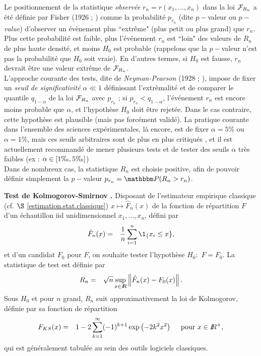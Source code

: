  Le positionnement de la statistique {\it observ\'ee} $r_n=r(x_1,\ldots,x_n)$ dans la loi ${\cal{F}}_{R_n}$ a \'et\'e d\'efinie par Fisher (1926 ; \cite{Fisher1926}) comme la probabilit\'e $p_{r_n}$ (dite $p-$valeur ou {\it $p-$value}) d'observer un \'ev\`enement plus ``extr\^eme" (plus petit ou plus grand) que $r_n$.
Plus cette probabilit\'e est faible, plus l'\'ev\'enement  $r_n$ est ``loin" des valeurs de $R_n$ de plus haute densit\'e, et moins $H_0$ est probable (rappelons que la $p-$valeur n'est pas la probabilit\'e que $H_0$ soit vraie). En d'autres termes, si $H_0$ est fausse, $r_n$ devrait \^etre une valeur extr\^eme de ${\cal{F}}_{R_n}$. \\

L'approche courante des tests, dite de {\it Neyman-Pearson} (1928 ; \cite{Lehman2011}), impose de fixer un {\it seuil de significativit\'e} $\alpha \ll 1$ d\'efinissant l'extr\^emalit\'e et de comparer le quantile  $q_{1-\alpha}$ de la loi ${\cal{F}}_{R_n}$ avec $p_{r_n}$ ; si $p_{r_n}<q_{1-\alpha}$, l'\'ev\'enement $r_n$ est encore moins probable que $\alpha$, et l'hypoth\`ese $H_0$ doit \^etre rejet\'ee. Dans le cas contraire, cette hypoth\`ese est plausible (mais pas forc\'ement valid\'e). La pratique courante dans l'ensemble des sciences exp\'erimentales, l\`a encore, est de fixer $\alpha=5\%$ ou $\alpha=1\%$, mais ces seuils arbitraires sont de plus en plus critiqu\'es \cite{Nuzzo2014,Evans2016}, et il est actuellement recommand\'e \cite{Johnson2013,Benjamin2017} de mener plusieurs tests et de tester des seuils $\alpha$ tr\`es faibles (ex : $\alpha\in[1\text{\textperthousand},5\text{\textperthousand}]$) \\

Dans de nombreux cas, la statistique $R_n$ est choisie positive, afin de pouvoir d\'efinir simplement la $p-$valeur $p_{r_n}=\Pm(R_n>r_n)$. \\

\begin{exo}\label{ks.test}  {\bf Test de Kolmogorov-Smirnov \cite{Stephens1974}.} 
\noindent Disposant de l'estimateur empirique classique (cf. $\S$ \ref{estimation.stat.classique}) $x\mapsto\hat{F}_n(x)$ de la fonction de r\'epartition $F$  d'un \'echantillon iid unidimensionnel $x_1,\ldots,x_n$, d\'efini par
\begin{eqnarray*}
\hat{F}_n(x) & = & \frac{1}{n}\sum\limits_{i=1}^n \1_\{x_i \leq x\},
\end{eqnarray*}
et d'un candidat $F_0$ pour $F$, on souhaite tester l'hypoth\`ese $H_0:$ $F=F_0$. La statistique de test est d\'efinie par
\begin{eqnarray*}
R_n & = & \sqrt{n}\sup\limits_{x\in I\!\!R} \left\|\hat{F}_n(x)-F_0(x)\right\|.
\end{eqnarray*} 
Sous $H_0$ et pour $n$ grand, $R_n$ suit approximativement la loi de Kolmogorov, d\'efinie par sa fonction de r\'epartition
\begin{eqnarray*}
F_{KS}(x) & = & 1 - 2\sum\limits_{k=1}^{\infty} (-1)^{k+1} \exp\left(-2k^2 x^2\right) \ \ \ \ \text{pour $x\in I\!\!R^+$,}
\end{eqnarray*} 
qui est g\'en\'eralement tabul\'ee au sein des outils logiciels classiques.
\end{exo}

